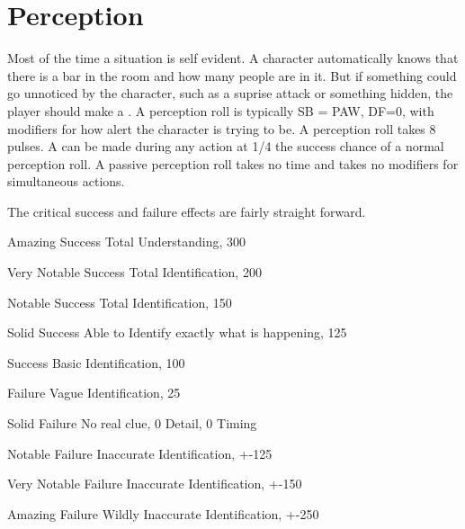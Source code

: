 \section{Perception}

Most of the time a situation is self evident. A character automatically
knows that there is a bar in the room and how many people are in it.
But if something could go unnoticed by the character, such as a suprise 
attack or something hidden, the player should make a . 
A perception roll is typically SB = PAW, DF=0, with modifiers for 
how alert the character is trying to be. A perception roll takes
8 pulses. A  can be made
during any action at 1/4 the success chance of a normal perception roll. A
passive perception roll takes no time and takes no modifiers for 
simultaneous actions.

The critical success and failure effects are fairly straight forward. 

\begin{description}
	\item Amazing Success
        Total Understanding, 300%

	\item Very Notable Success
        Total Identification, 200%

    \item Notable Success
        Total Identification, 150%

	\item Solid Success
        Able to Identify exactly what is happening, 125%

	\item Success
        Basic Identification, 100%

	\item Failure
        Vague Identification, 25%

	\item Solid Failure
        No real clue, 0 Detail, 0 Timing

	\item Notable Failure
        Inaccurate Identification, +-125%

	\item Very Notable Failure
        Inaccurate Identification, +-150%

	\item Amazing Failure
        Wildly Inaccurate Identification, +-250%
\end{description}


